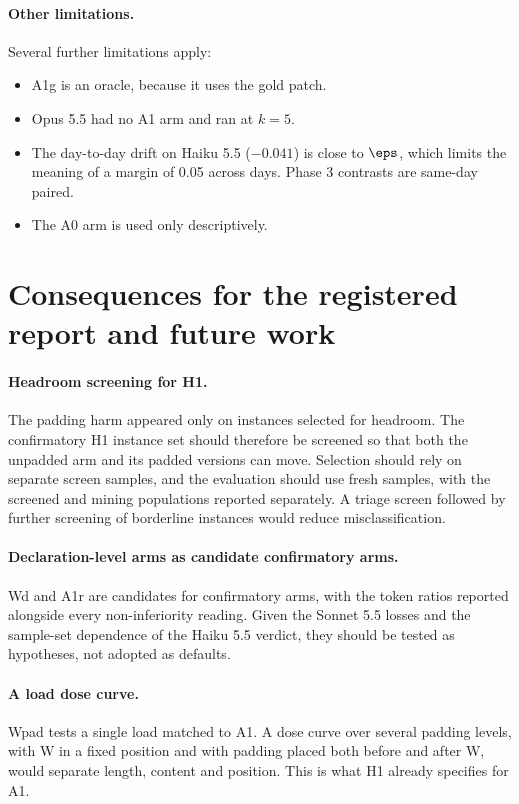 \paragraph{Other limitations.} Several further limitations apply:
\begin{itemize}
\item A1g is an oracle, because it uses the gold patch.
\item Opus 5.5 had no A1 arm and ran at $k=5$.
\item The day-to-day drift on Haiku 5.5 ($-0.041$) is close to $\eps$, which limits the meaning of a margin of 0.05 across days. Phase 3 contrasts are same-day paired.
\item The A0 arm is used only descriptively.
\end{itemize}

\section{Consequences for the registered report and future work}

\paragraph{Headroom screening for H1.} The padding harm appeared only on instances selected for headroom. The confirmatory H1 instance set should therefore be screened so that both the unpadded arm and its padded versions can move. Selection should rely on separate screen samples, and the evaluation should use fresh samples, with the screened and mining populations reported separately. A triage screen followed by further screening of borderline instances would reduce misclassification.

\paragraph{Declaration-level arms as candidate confirmatory arms.} Wd and A1r are candidates for confirmatory arms, with the token ratios reported alongside every non-inferiority reading. Given the Sonnet 5.5 losses and the sample-set dependence of the Haiku 5.5 verdict, they should be tested as hypotheses, not adopted as defaults.

\paragraph{A load dose curve.} Wpad tests a single load matched to A1. A dose curve over several padding levels, with W in a fixed position and with padding placed both before and after W, would separate length, content and position. This is what H1 already specifies for A1.

